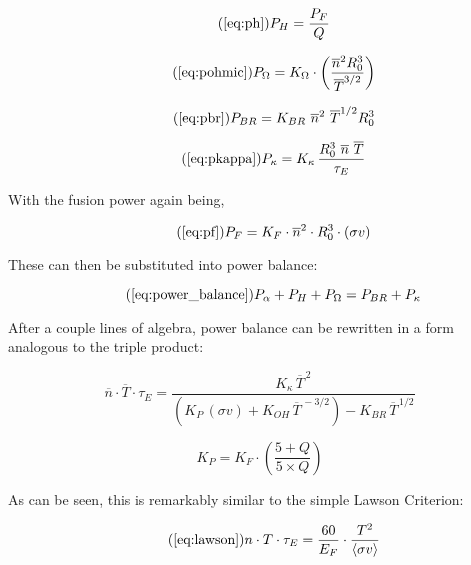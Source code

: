 \begin{equation}
	\tag{\ref{eq:ph}}
	P_H = \frac{P_F}{Q}
\end{equation}

\begin{equation}
	\tag{\ref{eq:pohmic}}
	P_\Omega = K_\Omega \cdot \left( \frac{ \overline n ^ 2 R_0^3 }{\overline T ^ {3/2}} \right)
\end{equation}

\begin{equation}
	\tag{\ref{eq:pbr}}
	P_{BR} = K_{BR} \ \overline n ^ 2 \ \overline T ^ {1/2} R_0^3 
\end{equation}

\begin{equation}
	\tag{\ref{eq:pkappa}}
	P_\kappa = K_\kappa \, \frac{ R_0 ^ 3 \ \overline{n}  \ \overline{T}  }{\tau_E} 
\end{equation}

With the fusion power again being,

\begin{equation}
	\tag{\ref{eq:pf}}
	P_F = K_F \cdot \overline{n}^2 \cdot R_0^3  \cdot (\sigma v)
\end{equation}

These can then be substituted into power balance:

\begin{equation}
	\tag{\ref{eq:power_balance}}
	P_\alpha + P_H + P_\Omega = P_{BR} + P_\kappa
\end{equation}

After a couple lines of algebra, power balance can be rewritten in a form analogous to the triple product:

\begin{equation}
	\label{eq:ntaue}
	 \overline{n}  \cdot \overline{T} \cdot \tau_E = \frac{ K_\kappa \, \overline{T}^{\,2} }{ \left( K_P \, (\sigma v) +  K_{OH} \, \overline{T}^{  \,-3/2 } \right) - K_{BR} \, \overline{T}^{  \,1/2 } }
\end{equation}

\begin{equation}
	K_P = K_F \cdot \left( \frac{5 + Q}{5 \times Q} \right)
\end{equation}

As can be seen, this is remarkably similar to the simple Lawson Criterion:

\begin{equation}
	\tag{\ref{eq:lawson}}
	n \cdot T \cdot \tau_E = \frac{ 60 }{ E_F } \cdot \frac{ T ^ 2 }{ \langle \sigma v \rangle }
\end{equation} 


